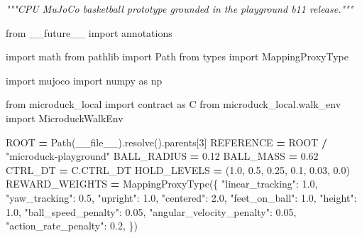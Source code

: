 \documentclass[
  american,
  11pt,
  letterpaper,
]{article}
\newenvironment{Shaded}{\begin{snugshade}}{\end{snugshade}}
\newcommand{\CommentTok}[1]{\textcolor[rgb]{0.56,0.35,0.01}{\textit{#1}}}
\newcommand{\DecValTok}[1]{\textcolor[rgb]{0.00,0.00,0.81}{#1}}
\newcommand{\FloatTok}[1]{\textcolor[rgb]{0.00,0.00,0.81}{#1}}
\newcommand{\ImportTok}[1]{#1}
\newcommand{\NormalTok}[1]{#1}
\newcommand{\OperatorTok}[1]{\textcolor[rgb]{0.81,0.36,0.00}{\textbf{#1}}}
\newcommand{\StringTok}[1]{\textcolor[rgb]{0.31,0.60,0.02}{#1}}
\newcommand{\VariableTok}[1]{\textcolor[rgb]{0.00,0.00,0.00}{#1}}
\renewenvironment{Shaded}{\par\smallskip}{\par\smallskip}
\begin{document}
\begin{Shaded}
\begin{Highlighting}[]
\CommentTok{"""CPU MuJoCo basketball prototype grounded in the playground b11 release."""}

\ImportTok{from}\NormalTok{ \_\_future\_\_ }\ImportTok{import}\NormalTok{ annotations}

\ImportTok{import}\NormalTok{ math}
\ImportTok{from}\NormalTok{ pathlib }\ImportTok{import}\NormalTok{ Path}
\ImportTok{from}\NormalTok{ types }\ImportTok{import}\NormalTok{ MappingProxyType}

\ImportTok{import}\NormalTok{ mujoco}
\ImportTok{import}\NormalTok{ numpy }\ImportTok{as}\NormalTok{ np}

\ImportTok{from}\NormalTok{ microduck\_local }\ImportTok{import}\NormalTok{ contract }\ImportTok{as}\NormalTok{ C}
\ImportTok{from}\NormalTok{ microduck\_local.walk\_env }\ImportTok{import}\NormalTok{ MicroduckWalkEnv}

\NormalTok{ROOT }\OperatorTok{=}\NormalTok{ Path(}\VariableTok{\_\_file\_\_}\NormalTok{).resolve().parents[}\DecValTok{3}\NormalTok{]}
\NormalTok{REFERENCE }\OperatorTok{=}\NormalTok{ ROOT }\OperatorTok{/} \StringTok{"microduck{-}playground"}
\NormalTok{BALL\_RADIUS }\OperatorTok{=} \FloatTok{0.12}
\NormalTok{BALL\_MASS }\OperatorTok{=} \FloatTok{0.62}
\NormalTok{CTRL\_DT }\OperatorTok{=}\NormalTok{ C.CTRL\_DT}
\NormalTok{HOLD\_LEVELS }\OperatorTok{=}\NormalTok{ (}\FloatTok{1.0}\NormalTok{, }\FloatTok{0.5}\NormalTok{, }\FloatTok{0.25}\NormalTok{, }\FloatTok{0.1}\NormalTok{, }\FloatTok{0.03}\NormalTok{, }\FloatTok{0.0}\NormalTok{)}
\NormalTok{REWARD\_WEIGHTS }\OperatorTok{=}\NormalTok{ MappingProxyType(\{}
    \StringTok{"linear\_tracking"}\NormalTok{: }\FloatTok{1.0}\NormalTok{,}
    \StringTok{"yaw\_tracking"}\NormalTok{: }\FloatTok{0.5}\NormalTok{,}
    \StringTok{"upright"}\NormalTok{: }\FloatTok{1.0}\NormalTok{,}
    \StringTok{"centered"}\NormalTok{: }\FloatTok{2.0}\NormalTok{,}
    \StringTok{"feet\_on\_ball"}\NormalTok{: }\FloatTok{1.0}\NormalTok{,}
    \StringTok{"height"}\NormalTok{: }\FloatTok{1.0}\NormalTok{,}
    \StringTok{"ball\_speed\_penalty"}\NormalTok{: }\FloatTok{0.05}\NormalTok{,}
    \StringTok{"angular\_velocity\_penalty"}\NormalTok{: }\FloatTok{0.05}\NormalTok{,}
    \StringTok{"action\_rate\_penalty"}\NormalTok{: }\FloatTok{0.2}\NormalTok{,}
\NormalTok{\})}



\end{Highlighting}
\end{Shaded}
\end{document}
